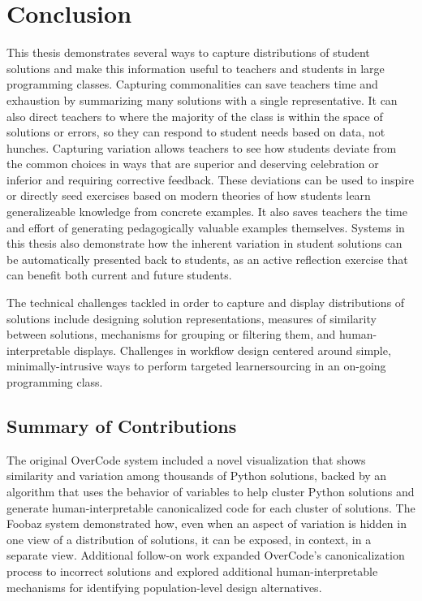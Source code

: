 \chapter{Conclusion}\label{chapter:conclusion}

This thesis demonstrates several ways to capture distributions of student solutions and make this information useful to teachers and students in large programming classes. Capturing commonalities can save teachers time and exhaustion by summarizing many solutions with a single representative. It can also direct teachers to where the majority of the class is within the space of solutions or errors, so they can respond to student needs based on data, not hunches. Capturing variation allows teachers to see how students deviate from the common choices in ways that are superior and deserving celebration or inferior and requiring corrective feedback. These deviations can be used to inspire or directly seed exercises based on modern theories of how students learn generalizeable knowledge from concrete examples. It also saves teachers the time and effort of generating pedagogically valuable examples themselves. Systems in this thesis also demonstrate how the inherent variation in student solutions can be automatically presented back to students, as an active reflection exercise that can benefit both current and future students. 

The technical challenges tackled in order to capture and display distributions of solutions include designing solution representations, measures of similarity between solutions, mechanisms for grouping or filtering them, and human-interpretable displays. Challenges in workflow design centered around simple, minimally-intrusive ways to perform targeted learnersourcing in an on-going programming class.

\section{Summary of Contributions}

The original OverCode system included a novel visualization that shows similarity and variation among thousands of Python solutions, backed by an algorithm that uses the behavior of variables to help cluster Python solutions and generate human-interpretable canonicalized code for each cluster of solutions. The Foobaz system demonstrated how, even when an aspect of variation is hidden in one view of a distribution of solutions, it can be exposed, in context, in a separate view. Additional follow-on work expanded OverCode's canonicalization process to incorrect solutions and explored additional human-interpretable mechanisms for identifying population-level design alternatives.

